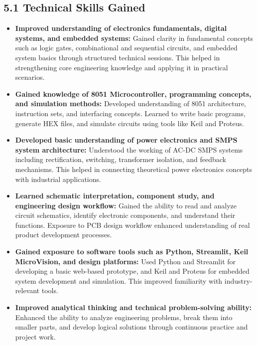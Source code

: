 \documentclass[10pt]{article}
\begin{document}
\subsection*{5.1 Technical Skills Gained}
\begin{itemize}

\item \textbf{Improved understanding of electronics fundamentals, digital systems, and embedded systems:}  
Gained clarity in fundamental concepts such as logic gates, combinational and sequential circuits, and embedded system basics through structured technical sessions. This helped in strengthening core engineering knowledge and applying it in practical scenarios.

\item \textbf{Gained knowledge of 8051 Microcontroller, programming concepts, and simulation methods:}  
Developed understanding of 8051 architecture, instruction sets, and interfacing concepts. Learned to write basic programs, generate HEX files, and simulate circuits using tools like Keil and Proteus.

\item \textbf{Developed basic understanding of power electronics and SMPS system architecture:}  
Understood the working of AC-DC SMPS systems including rectification, switching, transformer isolation, and feedback mechanisms. This helped in connecting theoretical power electronics concepts with industrial applications.

\item \textbf{Learned schematic interpretation, component study, and engineering design workflow:}  
Gained the ability to read and analyze circuit schematics, identify electronic components, and understand their functions. Exposure to PCB design workflow enhanced understanding of real product development processes.

\item \textbf{Gained exposure to software tools such as Python, Streamlit, Keil MicroVision, and design platforms:}  
Used Python and Streamlit for developing a basic web-based prototype, and Keil and Proteus for embedded system development and simulation. This improved familiarity with industry-relevant tools.

\item \textbf{Improved analytical thinking and technical problem-solving ability:}  
Enhanced the ability to analyze engineering problems, break them into smaller parts, and develop logical solutions through continuous practice and project work.

\end{itemize}
\end{document}
